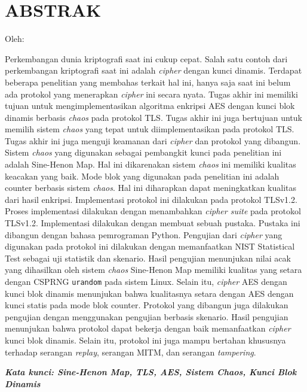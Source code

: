 \clearpage
\chapter*{ABSTRAK}

\begin{center}
  \center
  \begin{singlespace}
    \bfseries \MakeUppercase{\thetitle}

    \normalfont\normalsize
    Oleh:
    \bfseries \theauthor
  \end{singlespace}
\end{center}


\begin{singlespace}
  Perkembangan dunia kriptografi saat ini cukup cepat. Salah satu contoh dari perkembangan kriptografi saat ini adalah \emph{cipher} dengan kunci dinamis. Terdapat beberapa penelitian yang membahas terkait hal ini, hanya saja saat ini belum ada protokol yang menerapkan \emph{cipher} ini secara nyata. Tugas akhir ini memiliki tujuan untuk mengimplementasikan algoritma enkripsi AES dengan kunci blok dinamis berbasis \emph{chaos} pada protokol TLS. Tugas akhir ini juga bertujuan untuk memilih sistem \emph{chaos} yang tepat untuk diimplementasikan pada protokol TLS. Tugas akhir ini juga menguji keamanan dari \emph{cipher} dan protokol yang dibangun. Sistem \emph{chaos} yang digunakan sebagai pembangkit kunci pada penelitian ini adalah Sine-Henon Map. Hal ini dikarenakan sistem \emph{chaos} ini memiliki kualitas keacakan yang baik. Mode blok yang digunakan pada penelitian ini adalah counter berbasis sistem \emph{chaos}. Hal ini diharapkan dapat meningkatkan kualitas dari hasil enkripsi. Implementasi protokol ini dilakukan pada protokol TLSv1.2. Proses implementasi dilakukan dengan menambahkan \emph{cipher suite} pada protokol TLSv1.2. Implementasi dilakukan dengan membuat sebuah pustaka. Pustaka ini dibangun dengan bahasa pemrograman Python. Pengujian dari \emph{cipher} yang digunakan pada protokol ini dilakukan dengan memanfaatkan NIST Statistical Test sebagai uji statistik dan skenario. Hasil pengujian menunjukan nilai acak yang dihasilkan oleh sistem \emph{chaos} Sine-Henon Map memiliki kualitas yang setara dengan CSPRNG \texttt{urandom} pada sistem Linux. Selain itu, \emph{cipher} AES dengan kunci blok dinamis menunjukan bahwa kualitasnya setara dengan AES dengan kunci statis pada mode blok counter. Protokol yang dibangun juga dilakukan pengujian dengan menggunakan pengujian berbasis skenario. Hasil pengujian menunjukan bahwa protokol dapat bekerja dengan baik memanfaatkan \emph{cipher} kunci blok dinamis. Selain itu, protokol ini juga mampu bertahan khususnya terhadap serangan \emph{replay}, serangan MITM, dan serangan \emph{tampering}.
  
  \textbf{\textit{Kata kunci: Sine-Henon Map, TLS, AES, Sistem Chaos, Kunci Blok Dinamis }}
\end{singlespace}
\clearpage
